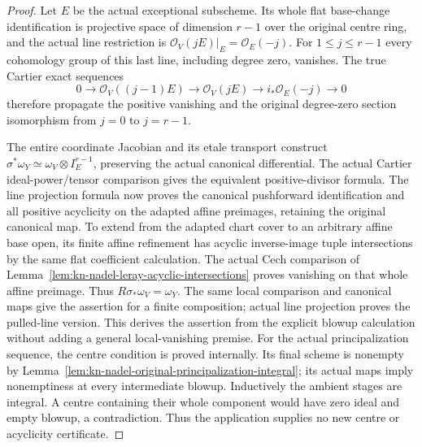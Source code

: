 \begin{proof}
Let $E$ be the actual exceptional subscheme.  Its whole flat base-change
identification is projective space of dimension $r-1$ over the original
centre ring, and the actual line restriction is
$\mathcal O_V(jE)|_E=\mathcal O_E(-j)$.  For $1\leq j\leq r-1$ every
cohomology group of this last line, including degree zero, vanishes.
The true Cartier exact sequences
\[
 0\longrightarrow\mathcal O_V((j-1)E)
 \longrightarrow\mathcal O_V(jE)
 \longrightarrow i_*\mathcal O_E(-j)\longrightarrow0
\]
therefore propagate the positive vanishing and the original degree-zero
section isomorphism from $j=0$ to $j=r-1$.

The entire coordinate Jacobian and its etale transport construct
$\sigma^*\omega_Y\simeq\omega_V\otimes I_E^{r-1}$, preserving the
actual canonical differential.  The actual Cartier ideal-power/tensor
comparison gives the equivalent positive-divisor formula.  The line
projection formula now proves the canonical pushforward identification
and all positive acyclicity on the adapted affine preimages, retaining
the original canonical map.  To extend from the adapted chart cover to
an arbitrary affine base open, its finite affine refinement has acyclic
inverse-image tuple intersections by the same flat coefficient
calculation.  The actual Cech comparison of
Lemma~\ref{lem:kn-nadel-leray-acyclic-intersections} proves vanishing on
that whole affine preimage.  Thus $R\sigma_*\omega_V=\omega_Y$.
The same local comparison and canonical maps give the assertion for a
finite composition; actual line projection proves the pulled-line
version.  This derives the assertion from the explicit blowup
calculation without adding a general local-vanishing premise.
For the actual principalization sequence, the centre condition is proved
internally.  Its final scheme is nonempty by
Lemma~\ref{lem:kn-nadel-original-principalization-integral}; its actual
maps imply nonemptiness at every intermediate blowup.  Inductively the
ambient stages are integral.  A centre containing their whole component
would have zero ideal and empty blowup, a contradiction.  Thus the
application supplies no new centre or acyclicity certificate.
\end{proof}

